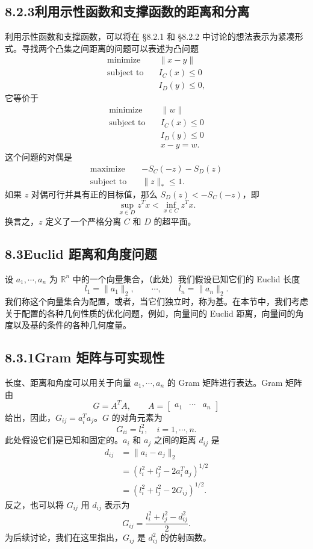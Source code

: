 \documentclass[UTF8,12pt,a4paper,fontset=fandol]{ctexart}
\begin{document}
\subsection*{8.2.3\quad 利用示性函数和支撑函数的距离和分离}

利用示性函数和支撑函数，可以将在 \S 8.2.1 和 \S 8.2.2 中讨论的想法表示为紧凑形式。寻找两个凸集之间距离的问题可以表述为凸问题
\[
\begin{aligned}
\text{minimize}\quad & \|x-y\|\\
\text{subject to}\quad & I_C(x)\leq 0\\
& I_D(y)\leq 0,
\end{aligned}
\]
它等价于
\[
\begin{aligned}
\text{minimize}\quad & \|w\|\\
\text{subject to}\quad & I_C(x)\leq 0\\
& I_D(y)\leq 0\\
& x-y=w.
\end{aligned}
\]
这个问题的对偶是
\[
\begin{aligned}
\text{maximize}\quad & -S_C(-z)-S_D(z)\\
\text{subject to}\quad & \|z\|_\ast\leq 1.
\end{aligned}
\]
如果 $z$ 对偶可行并具有正的目标值，那么 $S_D(z)<-S_C(-z)$，即
\[
\sup_{x\in D}z^Tx<\inf_{x\in C}z^Tx.
\]
换言之，$z$ 定义了一个严格分离 $C$ 和 $D$ 的超平面。

\subsection*{8.3\quad Euclid 距离和角度问题}

设 $a_1,\cdots,a_n$ 为 $\mathbb{R}^n$ 中的一个向量集合，（此处）我们假设已知它们的 Euclid 长度
\[
l_1=\|a_1\|_2,\qquad \cdots,\qquad l_n=\|a_n\|_2.
\]
我们称这个向量集合为配置，或者，当它们独立时，称为基。在本节中，我们考虑关于配置的各种几何性质的优化问题，例如，向量间的 Euclid 距离，向量间的角度以及基的条件的各种几何度量。

\subsection*{8.3.1\quad Gram 矩阵与可实现性}

长度、距离和角度可以用关于向量 $a_1,\cdots,a_n$ 的 Gram 矩阵进行表达。Gram 矩阵由
\[
G=A^TA,\qquad A=\begin{bmatrix}a_1&\cdots&a_n\end{bmatrix}
\]
给出，因此，$G_{ij}=a_i^Ta_j$。$G$ 的对角元素为
\[
G_{ii}=l_i^2,\quad i=1,\cdots,n.
\]
此处假设它们是已知和固定的。$a_i$ 和 $a_j$ 之间的距离 $d_{ij}$ 是
\[
\begin{aligned}
d_{ij}
&=\|a_i-a_j\|_2\\
&=(l_i^2+l_j^2-2a_i^Ta_j)^{1/2}\\
&=(l_i^2+l_j^2-2G_{ij})^{1/2}.
\end{aligned}
\]
反之，也可以将 $G_{ij}$ 用 $d_{ij}$ 表示为
\[
G_{ij}=\frac{l_i^2+l_j^2-d_{ij}^2}{2}.
\]
为后续讨论，我们在这里指出，$G_{ij}$ 是 $d_{ij}^2$ 的仿射函数。
\end{document}
